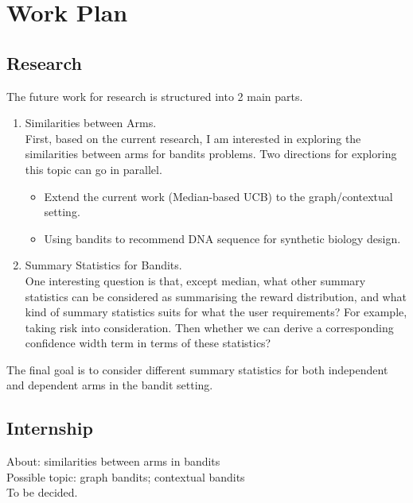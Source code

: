 
\chapter{Work Plan} \label{ch-1}

\section{Research}

The future work for research is structured into 2 main parts.

\begin{enumerate}
    \item Similarities between Arms.\\
    First, based on the current research, I am interested in exploring the similarities between arms for bandits problems. Two directions for exploring this topic can go in parallel. 
    \begin{itemize}
        \item Extend the current work (Median-based UCB) to the graph/contextual setting.
        \item Using bandits to recommend DNA sequence for synthetic biology design.
    \end{itemize}
    
    \item Summary Statistics for Bandits.\\
    One interesting question is that, except median, what other summary statistics can be considered as summarising the reward distribution, and what kind of summary statistics suits for what the user requirements? For example, taking risk into consideration. Then whether we can derive a corresponding confidence width term in terms of these statistics?  
    
\end{enumerate}

The final goal is to consider different summary statistics for both independent and dependent arms in the bandit setting.



\section{Internship}

About: similarities between arms in bandits\\
Possible topic: graph bandits; contextual bandits\\
To be decided.

